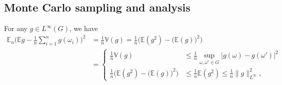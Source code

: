 \subsection{Monte Carlo sampling and analysis}


\begin{lemma}   \label{MC}
For any $g\in L^\infty(G)$, we have
  \begin{equation}
  \begin{split}
    \mathbb{E}_n\Big(\mathbb{E}g-\frac1n\sum_{i=1}^n
    g(\omega_i)\Big)^2
    &=\frac{1}{n}\mathbb{V}(g)=\frac{1}{n}\Big(\mathbb{E}(g^2) - \big (\mathbb{E}(g)\big )^2\Big)
    \\
    &=
    \left\{
             \begin{aligned}
    \frac{1}{n}\mathbb{V}(g)
   & \le\frac{1}{n} \sup_{\omega, \omega'\in G} |g(\omega) - g(\omega')|^2
    \\
\frac{1}{n}\Big(\mathbb{E}(g^2) - \big (\mathbb{E}(g)\big )^2\Big)
&\le\frac{1}{n} \mathbb E(g^2)\le \frac{1}{n}\|g\|^2_{L^\infty},
\end{aligned}
\right.
\end{split}
  \end{equation} 
\end{lemma}


